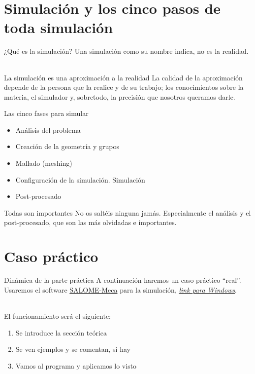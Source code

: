 \documentclass[12pt]{beamer}
\begin{document}
\section{Simulación y los cinco pasos de toda simulación}

\begin{frame}{¿Qué es la simulación?}
	Una simulación como su nombre indica, no es la realidad. \\~
	
	\begin{block}{La simulación es una aproximación a la realidad}
		La calidad de la aproximación depende de la persona que la realice y de su trabajo; los conocimientos sobre la materia, el simulador y, sobretodo, la precisión que nosotros queramos darle.
	\end{block}	
\end{frame}

\begin{frame}{Las cinco fases para simular}
	\begin{itemize}
		\item Análisis del problema
		\item Creación de la geometría y grupos
		\item Mallado (meshing)
		\item Configuración de la simulación. Simulación
		\item Post-procesado
	\end{itemize} \pause
	\begin{block}{Todas son importantes}
		No os saltéis ninguna jamás. Especialmente el análisis y el post-procesado, que son las más olvidadas e importantes.
	\end{block}
\end{frame}

\section{Caso práctico}

\begin{frame}{Dinámica de la parte práctica}
	A continuación haremos un caso práctico ``real''. Usaremos el software \href{https://code-aster.org/spip.php?article303}{SALOME-Meca} para la simulación, \href{https://code-aster-windows.com/download/}{\textit{link para Windows}}. \\~
	
	El funcionamiento será el siguiente:
	\begin{enumerate}
		\item Se introduce la sección teórica
		\item Se ven ejemplos y se comentan, si hay
		\item Vamos al programa y aplicamos lo visto
	\end{enumerate}
\end{frame}
\end{document}
